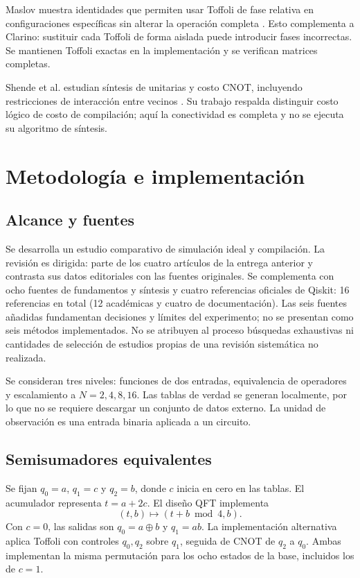 \documentclass[10pt,a4paper,twocolumn]{article}
\begin{document}
Maslov muestra identidades que permiten usar Toffoli de fase relativa en
configuraciones específicas sin alterar la operación completa
\cite{maslov2016}. Esto complementa a Clarino: sustituir cada Toffoli de
forma aislada puede introducir fases incorrectas. Se mantienen Toffoli
exactas en la implementación y se verifican matrices completas.

Shende et al. estudian síntesis de unitarias y costo CNOT, incluyendo
restricciones de interacción entre vecinos \cite{shende2006}. Su trabajo
respalda distinguir costo lógico de costo de compilación; aquí la
conectividad es completa y no se ejecuta su algoritmo de síntesis.

\section{Metodología e implementación}
\subsection{Alcance y fuentes}
Se desarrolla un estudio comparativo de simulación ideal y compilación.
La revisión es dirigida: parte de los cuatro artículos de la entrega anterior
y contrasta sus datos editoriales con las fuentes originales. Se complementa
con ocho fuentes de fundamentos y síntesis y cuatro referencias oficiales
de Qiskit: 16 referencias en total (12 académicas y cuatro de documentación).
Las seis fuentes añadidas fundamentan decisiones y límites del experimento;
no se presentan como seis métodos implementados.
No se atribuyen al proceso búsquedas exhaustivas ni cantidades de selección
de estudios propias de una revisión sistemática no realizada.

Se consideran tres niveles: funciones de dos entradas, equivalencia de
operadores y escalamiento a $N=2,4,8,16$. Las tablas de verdad se generan
localmente, por lo que no se requiere descargar un conjunto de datos externo.
La unidad de observación es una entrada binaria aplicada a un circuito.

\subsection{Semisumadores equivalentes}
Se fijan $q_0=a$, $q_1=c$ y $q_2=b$, donde $c$ inicia en cero en las tablas.
El acumulador representa $t=a+2c$. El diseño QFT implementa
\begin{equation}
(t,b)\longmapsto(t+b\bmod4,b).
\label{eq:sumador}
\end{equation}
Con $c=0$, las salidas son $q_0=a\oplus b$ y $q_1=ab$.
La implementación alternativa aplica Toffoli con controles $q_0,q_2$ sobre
$q_1$, seguida de CNOT de $q_2$ a $q_0$. Ambas implementan la misma
permutación para los ocho estados de la base, incluidos los de $c=1$.
\end{document}
